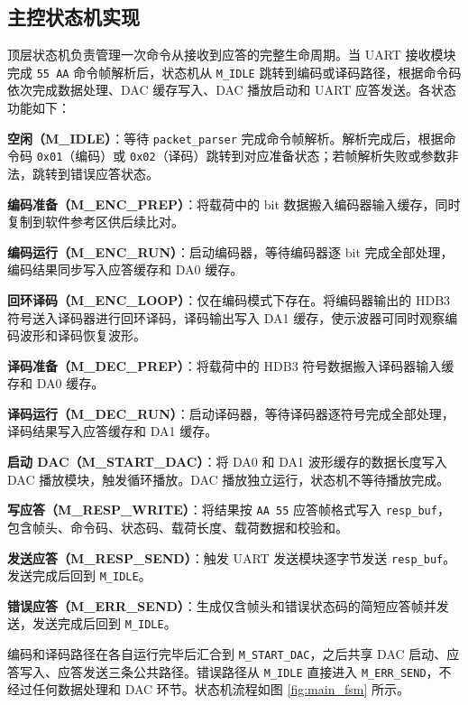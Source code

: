 \documentclass[UTF8,a4paper,12pt]{ctexart}
\begin{document}
\subsection{主控状态机实现}

顶层状态机负责管理一次命令从接收到应答的完整生命周期。当 UART 接收模块完成 \texttt{55 AA} 命令帧解析后，状态机从 \texttt{M\_IDLE} 跳转到编码或译码路径，根据命令码依次完成数据处理、DAC 缓存写入、DAC 播放启动和 UART 应答发送。各状态功能如下：

\textbf{空闲（M\_IDLE）}：等待 \texttt{packet\_parser} 完成命令帧解析。解析完成后，根据命令码 \texttt{0x01}（编码）或 \texttt{0x02}（译码）跳转到对应准备状态；若帧解析失败或参数非法，跳转到错误应答状态。

\textbf{编码准备（M\_ENC\_PREP）}：将载荷中的 bit 数据搬入编码器输入缓存，同时复制到软件参考区供后续比对。

\textbf{编码运行（M\_ENC\_RUN）}：启动编码器，等待编码器逐 bit 完成全部处理，编码结果同步写入应答缓存和 DA0 缓存。

\textbf{回环译码（M\_ENC\_LOOP）}：仅在编码模式下存在。将编码器输出的 HDB3 符号送入译码器进行回环译码，译码输出写入 DA1 缓存，使示波器可同时观察编码波形和译码恢复波形。

\textbf{译码准备（M\_DEC\_PREP）}：将载荷中的 HDB3 符号数据搬入译码器输入缓存和 DA0 缓存。

\textbf{译码运行（M\_DEC\_RUN）}：启动译码器，等待译码器逐符号完成全部处理，译码结果写入应答缓存和 DA1 缓存。

\textbf{启动 DAC（M\_START\_DAC）}：将 DA0 和 DA1 波形缓存的数据长度写入 DAC 播放模块，触发循环播放。DAC 播放独立运行，状态机不等待播放完成。

\textbf{写应答（M\_RESP\_WRITE）}：将结果按 \texttt{AA 55} 应答帧格式写入 \texttt{resp\_buf}，包含帧头、命令码、状态码、载荷长度、载荷数据和校验和。

\textbf{发送应答（M\_RESP\_SEND）}：触发 UART 发送模块逐字节发送 \texttt{resp\_buf}。发送完成后回到 \texttt{M\_IDLE}。

\textbf{错误应答（M\_ERR\_SEND）}：生成仅含帧头和错误状态码的简短应答帧并发送，发送完成后回到 \texttt{M\_IDLE}。

编码和译码路径在各自运行完毕后汇合到 \texttt{M\_START\_DAC}，之后共享 DAC 启动、应答写入、应答发送三条公共路径。错误路径从 \texttt{M\_IDLE} 直接进入 \texttt{M\_ERR\_SEND}，不经过任何数据处理和 DAC 环节。状态机流程如图 \ref{fig:main_fsm} 所示。
\end{document}
